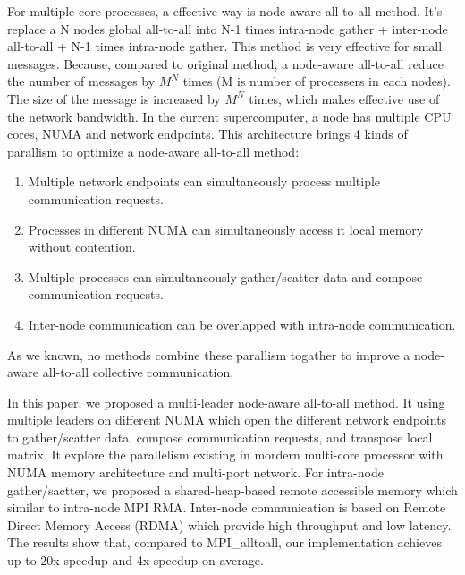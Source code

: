For multiple-core processes, a effective way is node-aware all-to-all method.
It's replace a N nodes global all-to-all into N-1 times intra-node gather + inter-node all-to-all  + N-1 times intra-node gather.
This method is very effective for small messages.
Because, compared to original method, a node-aware all-to-all reduce the number of messages by $M^N$ times (M is number of processers in each nodes).
The size of the message is increased by $M^N$ times, which makes effective use of the network bandwidth.
In the current supercomputer, a node has multiple CPU cores, NUMA and network endpoints.
This architecture brings 4 kinds of parallism to optimize a node-aware all-to-all method:
\begin{enumerate}[(1)]
\item Multiple network endpoints can simultaneously process multiple communication requests.
\item Processes in different NUMA can simultaneously access it local memory without contention.
\item Multiple processes can simultaneously gather/scatter data and compose communication requests.
\item Inter-node communication can be overlapped with intra-node communication.
\end{enumerate}
As we known, no methods combine these parallism togather to improve a node-aware all-to-all collective communication. 


In this paper, we proposed a multi-leader node-aware all-to-all method.
It using multiple leaders on different NUMA which open the different network endpoints to gather/scatter data, compose communication requests, and transpose local matrix.
It explore the parallelism existing in mordern multi-core processor with NUMA memory architecture and multi-port network.
For intra-node gather/sactter, we proposed a shared-heap-based remote accessible memory which similar to intra-node MPI RMA.
Inter-node communication is based on Remote Direct Memory Access (RDMA) which provide high throughput and low latency.
The results show that, compared to MPI\_alltoall, our implementation achieves up to 20x speedup and 4x speedup on average. 